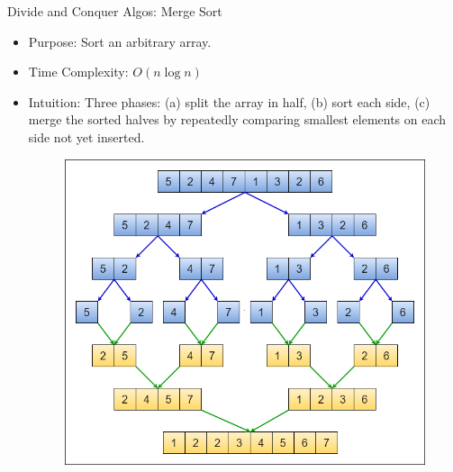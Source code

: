 \documentclass{beamer}
\begin{document}
\begin{frame}[t]{Divide and Conquer Algos: Merge Sort}
    \begin{itemize}
        \item \alert{Purpose:} Sort an arbitrary array.
        \item \alert{Time Complexity}: $O(n \log n)$
        \item \alert{Intuition:} Three phases: (a) split the array in half, (b) sort each side, (c) merge the sorted halves by repeatedly comparing smallest elements on each side not yet inserted.
        \begin{figure}
            \centering
            \includegraphics[width=0.5\linewidth]{mergesort.png}
        \end{figure}
    \end{itemize}
\end{frame}
\end{document}
